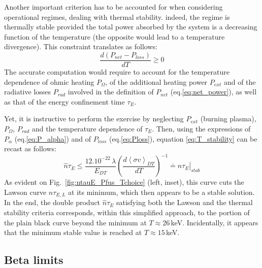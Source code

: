 Another important criterion has to be accounted for when considering operational regimes, dealing with thermal stability. indeed, the regime is thermally stable provided the total power absorbed by the system is a decreasing function of the temperature (the opposite would lead to a temperature divergence). This constraint translates as follows:
\begin{equation}
  \frac{d (P_{net} - P_{loss})}{dT} \geq 0
  \label{eq:T_stability}
\end{equation}
The accurate computation would require to account for the temperature dependence of ohmic heating $P_\Omega$, of the additional heating power $P_{ext}$ and of the radiative losses $P_{rad}$ involved in the definition of $P_{net}$ (eq.\ref{eq:net_power}), as well as that of the energy confinement time $\tau_E$.

Yet, it is instructive to perform the exercise by neglecting $P_{ext}$ (burning plasma), $P_\Omega$, $P_{rad}$ and the temperature dependence of $\tau_E$. Then, using the expressions of $P_\alpha$ (eq.\ref{eq:P_alpha}) and of $P_{loss}$ (eq.\ref{eq:Ploss}), equation \ref{eq:T_stability} can be recast as follows:
\begin{equation}
 \hat n \tau_E \leq \frac{12.10^{-22}\, \lambda}{E_{DT}} 
    \left( \frac{d \left< \sigma v \right>_{DT}}{dT} \right)^{-1} \doteq \left.\hat n \tau_E\right|_{stab}
\label{eq:T_stability_2}
\end{equation}
As evident on Fig.~\ref{fig:ntauE_Pfus_Tchoice} (left, inset), this curve cuts the Lawson curve $\hat n\tau_{E,L}$ at its minimum, which then appears to be a stable solution. In the end, the double product $\hat n\tau_{E}$ satisfying both the Lawson and the thermal stability criteria corresponds, within this simplified approach, to the portion of the plain black curve beyond the minimum at $T\approx 26\,$keV. 
Incidentally, it appears that the minimum stable value is reached at $T\approx 15\,$keV. 


\subsection*{Beta limits}

